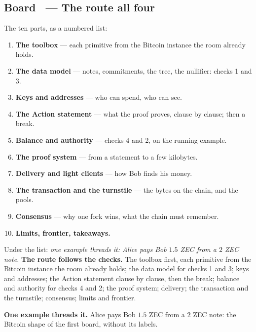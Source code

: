 \documentclass[11pt,a4paper]{article}
\makeatletter
\newcounter{board}
\newenvironment{board}[2]{\stepcounter{board}%
  \subsection*{Board \theboard\ --- #1 \hfill {\normalfont\small\color{arb}#2}}}{\medskip}
\newcommand{\Write}{\draw@head{Write}}
\newcommand{\Say}{\draw@head{Say}}
\makeatother
\begin{document}
\begin{board}{The route}{all four}
\Write
The ten parts, as a numbered list:
\begin{enumerate}
  \item \textbf{The toolbox} --- each primitive from the Bitcoin instance
    the room already holds.
  \item \textbf{The data model} --- notes, commitments, the tree, the
    nullifier: checks 1 and 3.
  \item \textbf{Keys and addresses} --- who can spend, who can see.
  \item \textbf{The Action statement} --- what the proof proves, clause by
    clause; then a break.
  \item \textbf{Balance and authority} --- checks 4 and 2, on the running
    example.
  \item \textbf{The proof system} --- from a statement to a few kilobytes.
  \item \textbf{Delivery and light clients} --- how Bob finds his money.
  \item \textbf{The transaction and the turnstile} --- the bytes on the
    chain, and the pools.
  \item \textbf{Consensus} --- why one fork wins, what the chain must
    remember.
  \item \textbf{Limits, frontier, takeaways.}
\end{enumerate}
Under the list: \emph{one example threads it: Alice pays Bob $1.5$ ZEC
from a $2$ ZEC note.}
\Say
\textbf{The route follows the checks.} The toolbox first, each primitive
from the Bitcoin instance the room already holds; the data model for
checks 1 and 3; keys and addresses; the Action statement clause by
clause, then the break; balance and authority for checks 4 and 2; the
proof system; delivery; the transaction and the turnstile; consensus;
limits and frontier.

\textbf{One example threads it.} Alice pays Bob $1.5$ ZEC from a $2$ ZEC
note: the Bitcoin shape of the first board, without its labels.


\end{board}
\end{document}
